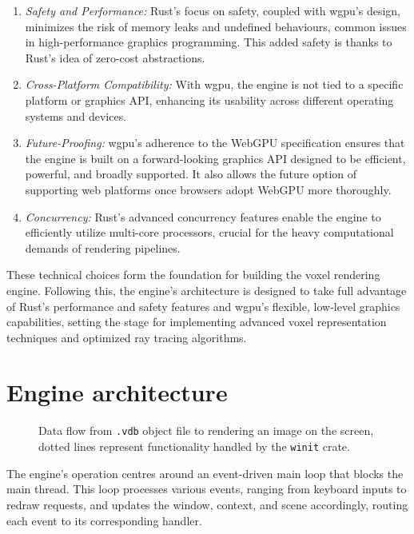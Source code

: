 \begin{enumerate}
  \item \emph{Safety and Performance:} Rust's focus on safety, coupled with wgpu's design, minimizes the risk of memory leaks and undefined behaviours, common issues in high-performance graphics programming. This added safety is thanks to Rust's idea of zero-cost abstractions.

  \item \emph{Cross-Platform Compatibility:} With wgpu, the engine is not tied to a specific platform or graphics API, enhancing its usability across different operating systems and devices.

  \item \emph{Future-Proofing:} wgpu's adherence to the WebGPU specification ensures that the engine is built on a forward-looking graphics API designed to be efficient, powerful, and broadly supported. It also allows the future option of supporting web platforms once browsers adopt WebGPU more thoroughly.

  \item \emph{Concurrency:} Rust's advanced concurrency features enable the engine to efficiently utilize multi-core processors, crucial for the heavy computational demands of rendering pipelines.
\end{enumerate}

These technical choices form the foundation for building the voxel rendering engine. Following this, the engine's architecture is designed to take full advantage of Rust's performance and safety features and wgpu's flexible, low-level graphics capabilities, setting the stage for implementing advanced voxel representation techniques and optimized ray tracing algorithms.

\section{Engine architecture}

\begin{figure}[H]
  \centering
  
  \caption[Engine architecture]{Data flow from \texttt{.vdb} object file to rendering an image on the screen, dotted lines represent functionality handled by the \texttt{winit} crate.}
\end{figure}

The engine's operation centres around an event-driven main loop that blocks the main thread.
This loop processes various events, ranging from keyboard inputs to redraw requests, and updates the window, context, and scene accordingly, routing each event to its corresponding handler.

